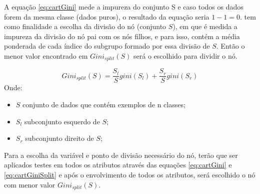 A equação \ref{eq:cartGini} mede a impureza do conjunto S e caso todos os dados forem da mesma classe (dados puros), o resultado da equação seria ${1-1=0}$. tem como finalidade a escolha da divisão do nó (conjunto ${S}$), em que é medida a impureza da divisão do nó pai com os nós filhos, e para isso, contém a média ponderada de cada índice do subgrupo formado por essa divisão de ${S}$. Então o menor valor encontrado em ${Gini_{split}(S)}$ será o escolhido para dividir o nó. 

\begin{equation}
Gini_{split}(S) = \frac{S_l}{S}gini(S_l)+\frac{S_r}{S}gini(S_r)
 \label{eq:cartGiniSplit}
\end{equation}
Onde:
\begin{itemize}[noitemsep]
            \item ${S}$ conjunto de dados que contém exemplos de n classes;
            \item ${S_l}$ subconjunto esquerdo de ${S}$;
            \item ${S_r}$ subconjunto direito de ${S}$;
        \end{itemize}

Para a escolha da variável e ponto de divisão necessário do nó, terão que ser aplicados testes em todos os atributos através das equações \ref{eq:cartGini} e \ref{eq:cartGiniSplit} e após o envolvimento de todos os atributos, será escolhido o nó com menor valor ${Gini_{split}(S)}$.




